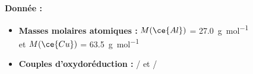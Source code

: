 \documentclass[a4paper,11pt,fleqn]{article}%
\begin{document}
\begin{figure}[H]
    \begin{minipage}{\linewidth}
    \textbf{Donnée :}
    \begin{itemize}
        \item \textbf{Masses molaires atomiques :} $M(\ce{Al})$ = \SI{27,0}{\gram\per\mole} et $M(\ce{Cu})$ = \SI{63,5}{\gram\per\mole}
        \item \textbf{ Couples d'oxydoréduction :} / et /
    \end{itemize}
    \end{minipage}
\end{figure}
\end{document}
